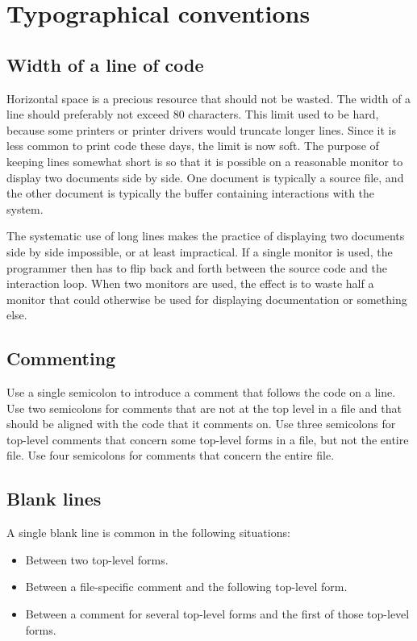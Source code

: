 \chapter{Typographical conventions}

\section{Width of a line of code}

Horizontal space is a precious resource that should not be wasted.
The width of a line should preferably not exceed 80 characters.  This
limit used to be hard, because some printers or printer drivers would
truncate longer lines.  Since it is less common to print code these
days, the limit is now soft.  The purpose of keeping lines somewhat
short is so that it is possible on a reasonable monitor to display two
documents side by side.  One document is typically a \commonlisp{}
source file, and the other document is typically the buffer containing
interactions with the \commonlisp{} system.

The systematic use of long lines makes the practice of displaying two
documents side by side impossible, or at least impractical.  If a
single monitor is used, the programmer then has to flip back and forth
between the source code and the interaction loop.  When two monitors
are used, the effect is to waste half a monitor that could otherwise
be used for displaying documentation or something else.

\section{Commenting}

Use a single semicolon to introduce a comment that follows the code on
a line.  Use two semicolons for comments that are not at the top level
in a file and that should be aligned with the code that it comments
on.  Use three semicolons for top-level comments that concern some
top-level forms in a file, but not the entire file.  Use four
semicolons for comments that concern the entire file.

\section{Blank lines}

A single blank line is common in the following situations:

\begin{itemize}
\item Between two top-level forms.
\item Between a file-specific comment and the following top-level
  form.
\item Between a comment for several top-level forms and the first
  of those top-level forms.
\end{itemize}

